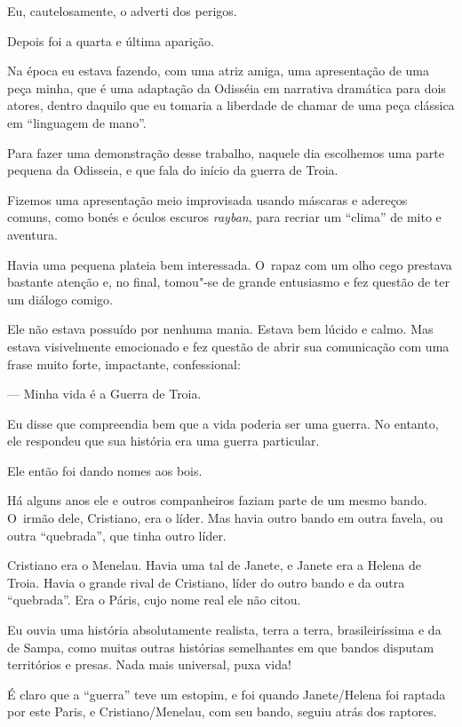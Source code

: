Eu, cautelosamente, o adverti dos perigos.

\asterisc{}

Depois foi a quarta e última aparição.

Na época eu estava fazendo, com uma atriz amiga, uma apresentação de uma
peça minha, que é uma adaptação da Odisséia em narrativa dramática para
dois atores, dentro daquilo que eu tomaria a liberdade de chamar de uma
peça clássica em ``linguagem de mano''.

Para fazer uma demonstração desse trabalho, naquele dia escolhemos uma
parte pequena da Odisseia, e que fala do início da guerra de Troia.

Fizemos uma apresentação meio improvisada usando máscaras e adereços
comuns, como bonés e óculos escuros \emph{rayban}, para recriar um ``clima'' de
mito e aventura.

Havia uma pequena plateia bem interessada. O~rapaz com um olho cego
prestava bastante atenção e, no final, tomou"-se de grande entusiasmo e
fez questão de ter um diálogo comigo.

Ele não estava possuído por nenhuma mania. Estava bem lúcido e calmo.
Mas estava visivelmente emocionado e fez questão de abrir sua
comunicação com uma frase muito forte, impactante, confessional:

— Minha vida é a Guerra de Troia.

Eu disse que compreendia bem que a vida poderia ser uma guerra. No
entanto, ele respondeu que sua história era uma guerra particular.

Ele então foi dando nomes aos bois.

Há alguns anos ele e outros companheiros faziam parte de um mesmo bando.
O~irmão dele, Cristiano, era o líder. Mas havia outro bando em outra
favela, ou outra ``quebrada'', que tinha outro líder.

Cristiano era o Menelau. Havia uma tal de Janete, e Janete era a Helena
de Troia. Havia o grande rival de Cristiano, líder do outro bando e da
outra ``quebrada''. Era o Páris, cujo nome real ele não citou.

Eu ouvia uma história absolutamente realista, terra a terra,
brasileiríssima e da  de Sampa, como muitas outras histórias
semelhantes em que bandos disputam territórios e presas. Nada mais
universal, puxa vida!

É claro que a ``guerra'' teve um estopim, e foi quando Janete/Helena foi
raptada por este Paris, e Cristiano/Menelau, com seu bando, seguiu atrás
dos raptores.

